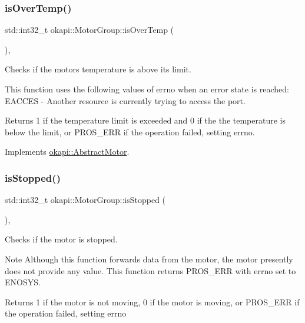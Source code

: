 \subsubsection{\texorpdfstring{isOverTemp()}{isOverTemp()}}
{\footnotesize\ttfamily std\+::int32\+\_\+t okapi\+::\+Motor\+Group\+::is\+Over\+Temp (\begin{DoxyParamCaption}{ }\end{DoxyParamCaption})\hspace{0.3cm}{\ttfamily [override]}, {\ttfamily [virtual]}}

Checks if the motor\textquotesingle{}s temperature is above its limit.

This function uses the following values of errno when an error state is reached\+: E\+A\+C\+C\+ES -\/ Another resource is currently trying to access the port.

\begin{DoxyReturn}{Returns}
1 if the temperature limit is exceeded and 0 if the the temperature is below the limit, or {\ttfamily P\+R\+O\+S\+\_\+\+E\+RR} if the operation failed, setting errno. 
\end{DoxyReturn}


Implements \mbox{\hyperlink{classokapi_1_1AbstractMotor_a61e24db43d1fe790b173cc0b4e27922f}{okapi\+::\+Abstract\+Motor}}.

\mbox{\label{classokapi_1_1MotorGroup_a50dfcb9272ad53aa231119a523ad2f2e}} 
\subsubsection{\texorpdfstring{isStopped()}{isStopped()}}
{\footnotesize\ttfamily std\+::int32\+\_\+t okapi\+::\+Motor\+Group\+::is\+Stopped (\begin{DoxyParamCaption}{ }\end{DoxyParamCaption})\hspace{0.3cm}{\ttfamily [override]}, {\ttfamily [virtual]}}

Checks if the motor is stopped.

\begin{DoxyNote}{Note}
Although this function forwards data from the motor, the motor presently does not provide any value. This function returns {\ttfamily P\+R\+O\+S\+\_\+\+E\+RR} with errno set to E\+N\+O\+S\+YS.
\end{DoxyNote}
\begin{DoxyReturn}{Returns}
1 if the motor is not moving, 0 if the motor is moving, or {\ttfamily P\+R\+O\+S\+\_\+\+E\+RR} if the operation failed, setting errno 
\end{DoxyReturn}


